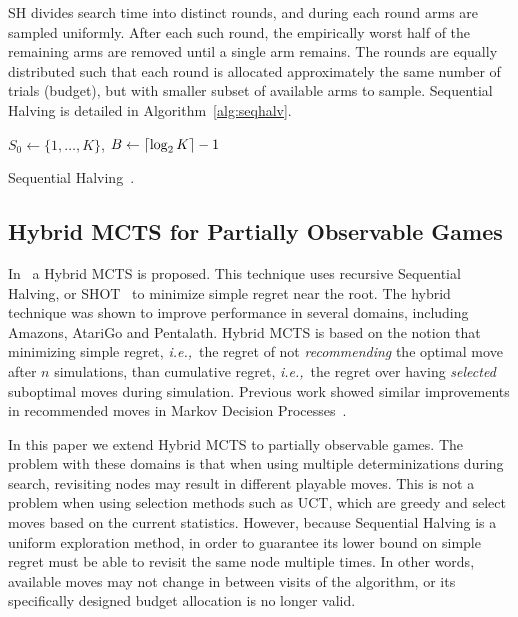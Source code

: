 \documentclass[a4paper]{llncs}
\DeclarePairedDelimiter{\ceil}{\lceil}{\rceil}
\DeclarePairedDelimiter{\floor}{\lfloor}{\rfloor}
\newcommand{\ie}{{\it i.e.,}~}
\begin{document}
SH divides search time into distinct rounds, and during each round arms are sampled uniformly. After each such round, the empirically worst half of the remaining arms are removed until a single arm remains. The rounds are equally distributed such that each round is allocated approximately the same number of trials (budget), but with smaller subset of available arms to sample. Sequential Halving is detailed in Algorithm~\ref{alg:seqhalv}.

\IncMargin{1em}
\begin{algorithm2e}[t]
	\vspace{0.05cm}
	$S_0 \gets \{1,\dots,K\}$,
	$B \gets \ceil{\log_2{K}} - 1$														\;
	\BlankLine
  \caption[Sequential Halving]{Sequential Halving~\protect\cite{Karnin13SH}. \label{alg:seqhalv}}
\end{algorithm2e}
\DecMargin{1em}

\subsection{Hybrid MCTS for Partially Observable Games}
\label{subsec:h-mcts_po}

In~\cite{Pepels14hmcts} a Hybrid MCTS is proposed. This technique uses recursive Sequential Halving, or SHOT~\cite{Cazenave14SHOT} to minimize simple regret near the root. The hybrid technique was shown to improve performance in several domains, including Amazons, AtariGo and Pentalath. Hybrid MCTS is based on the notion that minimizing simple regret, \ie the regret of not \emph{recommending} the optimal move after $n$ simulations, than cumulative regret, \ie the regret over having \emph{selected} suboptimal moves during simulation. Previous work showed similar improvements in recommended moves in Markov Decision Processes~\cite{Feldman12BRUE,tolpin2012mcts}.

In this paper we extend Hybrid MCTS to partially observable games. The problem with these domains is that when using multiple determinizations during search, revisiting nodes may result in different playable moves. This is not a problem when using selection methods such as UCT, which are greedy and select moves based on the current statistics. However, because Sequential Halving is a uniform exploration method, in order to guarantee its lower bound on simple regret must be able to revisit the same node multiple times. In other words, available moves may not change in between visits of the algorithm, or its specifically designed budget allocation is no longer valid.
\end{document}
